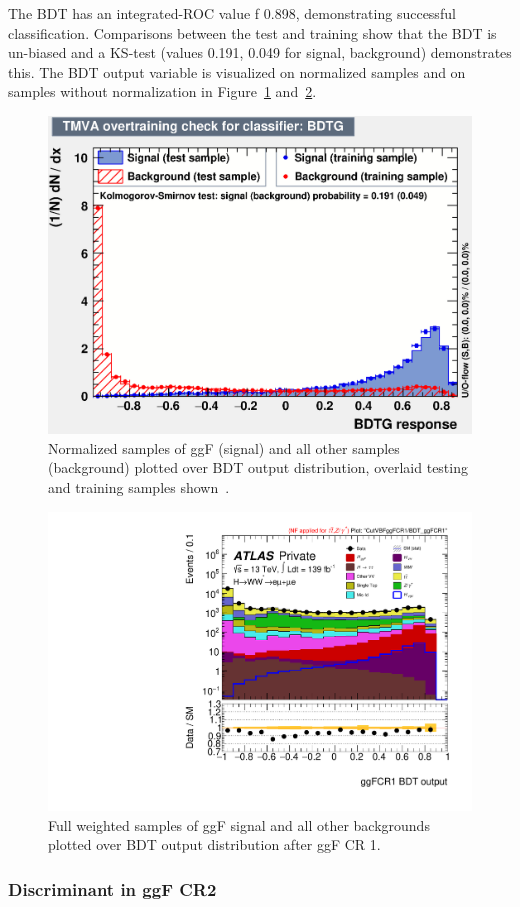 The BDT has an integrated-ROC value f 0.898, demonstrating successful classification. Comparisons between the test and training show that the BDT is un-biased and a KS-test (values 0.191, 0.049 for signal, background) demonstrates this. The BDT output variable is visualized on normalized samples and on samples without normalization in Figure~\ref{fig:ggFCR1BDTresult} and~\ref{fig:ggFCR1BDTresult2}.

\begin{figure}[!htbp]
\centering
  \includegraphics[width=.45\linewidth]{Pictures/ggFCR1/overtrain_BDTG.eps}
\caption{Normalized samples of ggF (signal) and all other samples (background) plotted over BDT output distribution, overlaid testing and training samples shown~\cite{ourSupportNote}.}
\label{fig:ggFCR1BDTresult}
\end{figure}

\begin{figure}[!htbp]
\centering
  \includegraphics[width=.45\linewidth]{Pictures/run2-emme-CutVBFggFCR1-BDT_ggFCR1-log.pdf}
\caption{Full weighted samples of ggF signal and all other backgrounds plotted over BDT output distribution after ggF CR 1.}
\label{fig:ggFCR1BDTresult2}
\end{figure}

\newpage
\subsubsection{Discriminant in ggF CR2}


